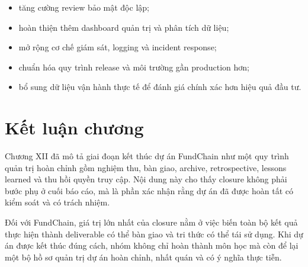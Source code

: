 \begin{itemize}
  \item tăng cường review bảo mật độc lập;
  \item hoàn thiện thêm dashboard quản trị và phân tích dữ liệu;
  \item mở rộng cơ chế giám sát, logging và incident response;
  \item chuẩn hóa quy trình release và môi trường gần production hơn;
  \item bổ sung dữ liệu vận hành thực tế để đánh giá chính xác hơn hiệu quả đầu tư.
\end{itemize}

\section{Kết luận chương}

Chương XII đã mô tả giai đoạn kết thúc dự án FundChain như một quy trình quản trị hoàn chỉnh gồm nghiệm thu, bàn giao, archive, retrospective, lessons learned và thu hồi quyền truy cập. Nội dung này cho thấy closure không phải bước phụ ở cuối báo cáo, mà là phần xác nhận rằng dự án đã được hoàn tất có kiểm soát và có trách nhiệm.

Đối với FundChain, giá trị lớn nhất của closure nằm ở việc biến toàn bộ kết quả thực hiện thành deliverable có thể bàn giao và tri thức có thể tái sử dụng. Khi dự án được kết thúc đúng cách, nhóm không chỉ hoàn thành môn học mà còn để lại một bộ hồ sơ quản trị dự án hoàn chỉnh, nhất quán và có ý nghĩa thực tiễn.
